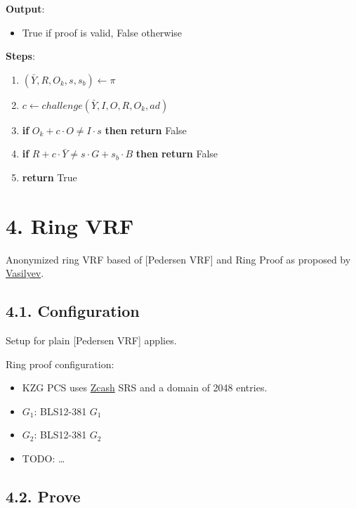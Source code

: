 \documentclass[
]{article}
\providecommand{\tightlist}{%
  \setlength{\itemsep}{0pt}\setlength{\parskip}{0pt}}
\begin{document}
\textbf{Output}:

\begin{itemize}
\tightlist
\item
  True if proof is valid, False otherwise
\end{itemize}

\textbf{Steps}:

\begin{enumerate}
\def\labelenumi{\arabic{enumi}.}
\tightlist
\item
  \((\bar{Y}, R, O_k, s, s_b) \leftarrow \pi\)
\item
  \(c \leftarrow challenge(\bar{Y}, I, O, R, O_k, ad)\)
\item
  \textbf{if} \(O_k + c \cdot O \neq I \cdot s\) \textbf{then}
  \textbf{return} False
\item
  \textbf{if} \(R + c \cdot \bar{Y} \neq s \cdot G + s_b \cdot B\)
  \textbf{then} \textbf{return} False
\item
  \textbf{return} True
\end{enumerate}

\hypertarget{ring-vrf}{%
\section{4. Ring VRF}\label{ring-vrf}}

Anonymized ring VRF based of {[}Pedersen VRF{]} and Ring Proof as
proposed by \href{https://hackmd.io/ulW5nFFpTwClHsD0kusJAA}{Vasilyev}.

\hypertarget{configuration-2}{%
\subsection{4.1. Configuration}\label{configuration-2}}

Setup for plain {[}Pedersen VRF{]} applies.

Ring proof configuration:

\begin{itemize}
\tightlist
\item
  KZG PCS uses
  \href{https://zfnd.org/conclusion-of-the-powers-of-tau-ceremony}{Zcash}
  SRS and a domain of 2048 entries.
\item
  \(G_1\): BLS12-381 \(G_1\)
\item
  \(G_2\): BLS12-381 \(G_2\)
\item
  TODO: \ldots{}
\end{itemize}

\hypertarget{prove-2}{%
\subsection{4.2. Prove}\label{prove-2}}
\end{document}
